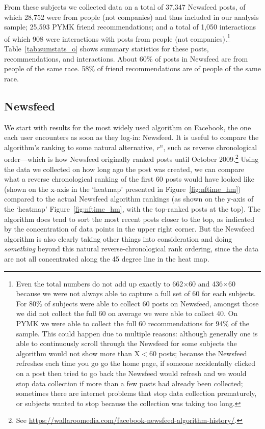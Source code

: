 \documentclass[12pt,letterpaper]{article}
\newcommand{\FullNFUSSurveySampleSize}{662}
\newcommand{\PYMKUSSurveySampleSize}{436}
\newcommand{\numposts}{37,347}
\newcommand{\numhposts}{28,752}
\newcommand{\numrecs}{25,593}
\newcommand{\numinteract}{1,050}
\newcommand{\numhinteract}{908}
\begin{document}
From these subjects we collected data on a total of \numposts{} Newsfeed posts, of which \numhposts{} were from people (not companies) and thus included in our analysis sample; \numrecs{} PYMK friend recommendations; and a total of \numinteract{} interactions of which \numhinteract{} were interactions with posts from people (not companies).\footnote{Even the total numbers do not add up exactly to \FullNFUSSurveySampleSize{}$\times$60 and \PYMKUSSurveySampleSize{}$\times$60 because we were not always able to capture a full set of 60 for each subjects. For 80\% of subjects were able to collect 60 posts on Newsfeed, amongst those we did not collect the full 60 on average we were able to collect 40. On PYMK we were able to collect the full 60 recommendations for 94\% of the sample.  This could happen due to multiple reasons: although generally one is able to continuously scroll through the Newsfeed for some subjects the algorithm would not show more than X$<$60 posts; because the Newsfeed refreshes each time you go go the home page, if someone accidentally clicked on a post then tried to go back the Newsfeed would refresh and we would stop data collection if more than a few posts had already been collected; sometimes there are internet problems that stop data collection prematurely, or subjects wanted to stop because the collection was taking too long.} Table~\ref{tab:sumstats_o} shows summary statistics for these posts, recommendations, and interactions.  About 60\% of posts in Newsfeed are from people of the same race. 58\% of friend recommendations are of people of the same race.

\subsection{Newsfeed}

We start with results for the most widely used algorithm on Facebook, the one each user encounters as soon as they log-in: Newsfeed. It is useful to compare the algorithm's ranking to some natural alternative, $r^n$, such as reverse chronological order---which is how Newsfeed originally ranked posts until October 2009.\footnote{See \url{https://wallaroomedia.com/facebook-newsfeed-algorithm-history/}.} Using the data we collected on how long ago the post was created, we can compare what a reverse chronological ranking of the first 60 posts would have looked like (shown on the x-axis in the `heatmap' presented in Figure~\ref{fig:nftime_hm}) compared to the actual Newsfeed algorithm rankings (as shown on the y-axis of the `heatmap' Figure~\ref{fig:nftime_hm}, with the top-ranked posts at the top). The algorithm does tend to sort the most recent posts closer to the top, as indicated by the concentration of data points in the upper right corner. But the Newsfeed algorithm is also clearly taking other things into consideration and doing \emph{something} beyond this natural reverse-chronological rank ordering, since the data are not all concentrated along the 45 degree line in the heat map.
\end{document}
